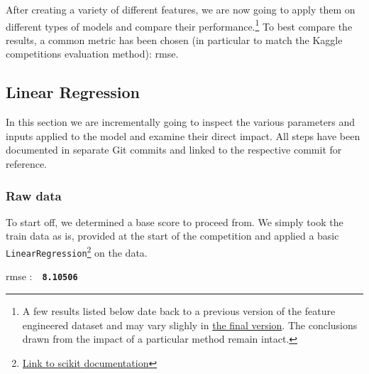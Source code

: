 \newcommand{\rmse}[1]{
	\vspace*{-2mm}
	\begin{center}
		\begin{tcolorbox}[colback=white, colframe=iwiPurple, halign=flush center, width=0.8\linewidth, boxrule=1pt, arc=4mm]
				\Acrshort{rmse} :\ \ \textbf{\texttt{#1}}
		\end{tcolorbox}
	\vspace*{-2mm}
	\end{center}
}


After creating a variety of different features, we are now going to apply them on different types of models and compare their performance.\footnote{A few results listed below date back to a previous version of the feature engineered dataset and may vary slighly in \href{\finalRepoMainURL}{the final version}. The conclusions drawn from the impact of a particular method remain intact.} To best compare the results, a common metric has been chosen (in particular to match the Kaggle competitions evaluation method): \acrfull{rmse}.

\subsection{Linear Regression}

In this section we are incrementally going to inspect the various parameters and inputs applied to the model and examine their direct impact. All steps have been documented in separate Git commits and linked to the respective commit for reference.

\subsubsection{Raw data}

To start off, we determined a base score to proceed from. We simply took the train data as is, provided at the start of the competition and applied a basic \texttt{LinearRegression}\footnote{\href{https://scikit-learn.org/stable/modules/generated/sklearn.linear_model.LinearRegression.html\#sklearn.linear_model.LinearRegression}{Link to \gls{scikit} documentation}} on the data.
\rmse{8.10506}


